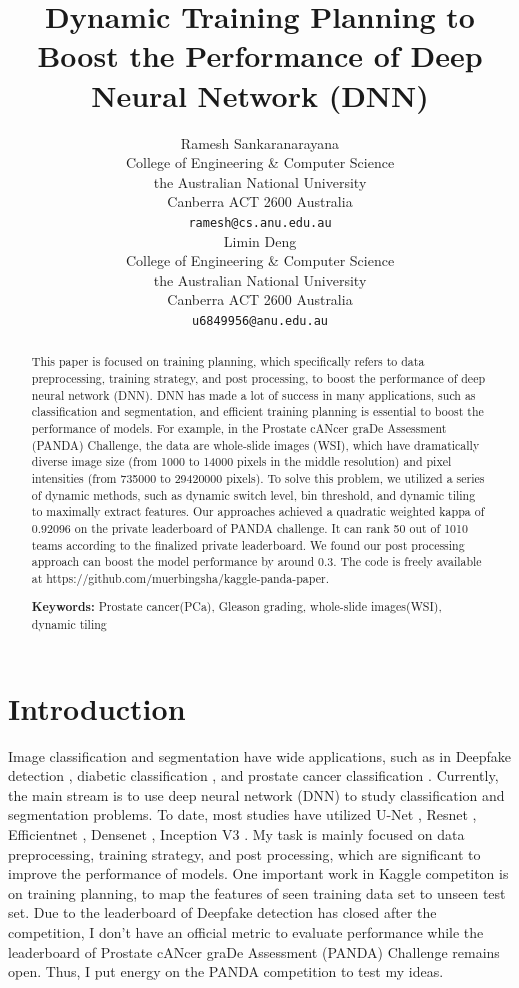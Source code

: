 \documentclass{article}
\title{Dynamic Training Planning to Boost the Performance of Deep Neural Network (DNN)}
\author{
  Ramesh Sankaranarayana \\
  College of Engineering \& Computer Science \\
  the Australian National University\\
  Canberra ACT 2600 Australia\\
  \texttt{ramesh@cs.anu.edu.au} \\
  \And
  Limin Deng\\
  College of Engineering \& Computer Science \\
  the Australian National University\\
  Canberra ACT 2600 Australia\\
  \texttt{u6849956@anu.edu.au} \\
}
\begin{document}
\maketitle

\begin{abstract}

This paper is focused on training planning, which specifically refers to data preprocessing, training strategy, and post processing, to boost the performance of deep neural network (DNN). DNN has made a lot of success in many applications, such as classification and segmentation, and efficient training planning is essential to boost the performance of models. For example, in the Prostate cANcer graDe Assessment (PANDA) Challenge, the data are whole-slide images (WSI), which have dramatically diverse image size (from 1000 to 14000 pixels in the middle resolution) and pixel intensities (from 735000 to 29420000 pixels). To solve this problem, we utilized a series of dynamic methods, such as dynamic switch level, bin threshold, and dynamic tiling to maximally extract features. Our approaches achieved a quadratic weighted kappa of 0.92096 on the private leaderboard of PANDA challenge. It can rank 50 out of 1010 teams according to the finalized private leaderboard. We found our post processing approach can boost the model performance by around 0.3. The code is freely available at https://github.com/muerbingsha/kaggle-panda-paper.   \par

\textbf{Keywords:} Prostate cancer(PCa), Gleason grading, whole-slide images(WSI), dynamic tiling


\end{abstract}





\section{Introduction}

Image classification and segmentation have wide applications, such as in Deepfake detection \citep{bonettini2020video}, diabetic classification \citep{mateen2020exudate}, and prostate cancer classification \citep{duran2020prometeo}. Currently, the main stream is to use deep neural network (DNN) to study classification and segmentation problems. To date, most studies have utilized U-Net \citep{ronneberger2015u}, Resnet \citep{he2016deep}, Efficientnet \citep{tan2019efficientnet},  Densenet \citep{huang2017densely}, Inception V3 \citep{szegedy2016rethinking}. My task is mainly focused on data preprocessing, training strategy, and post processing, which are significant to improve the performance of models. One important work in Kaggle competiton is on training planning, to map the features of seen training data set to unseen test set. Due to the leaderboard of Deepfake detection has closed after the competition, I don't have an official metric to evaluate performance while the leaderboard of Prostate cANcer graDe Assessment (PANDA) Challenge remains open. Thus, I put energy on the PANDA competition to test my ideas.
\end{document}
